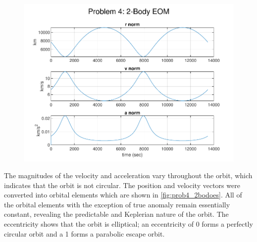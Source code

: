 \documentclass[conf]{new-aiaa}
\begin{document}
\begin{figure}[H]
	\centering
	\includegraphics{prob4_2bodeom.pdf}
	\caption{}
	\label{fig:prob4_2bodeom}
\end{figure}

The magnitudes of the velocity and acceleration vary throughout the orbit, which indicates that the orbit is not circular. The position and velocity vectors were converted into orbital elements which are shown in \ref{fig:prob4_2bodoes}. All of the orbital elements with the exception of true anomaly remain essentially constant, revealing the predictable and Keplerian nature of the orbit. The eccentricity shows that the orbit is elliptical; an eccentricity of 0 forms a perfectly circular orbit and a 1 forms a parabolic escape orbit. 
\end{document}
